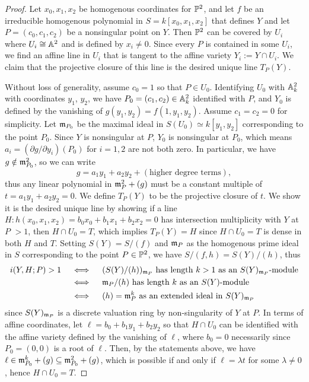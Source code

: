 \documentclass{article}
\begin{document}
\begin{enumerate} [label=\textbf{\arabic*.}, leftmargin=0cm]
\begin{proof}
  Let $x_0, x_1, x_2$ be homogenous coordinates for $\mathbb{P}^2$, and let $f$ be an irreducible homogenous polynomial in $S = k[x_0, x_1, x_2]$ that defines $Y$ and let $P = (c_0, c_1, c_2)$ be a nonsingular point on $Y$. Then $\mathbb{P}^2$ can be covered by $U_i$ where $U_i \cong \mathbb{A}^2$ and is defined by $x_i \neq 0$. Since every $P$ is contained in some $U_i$, we find an affine line in $U_i$ that is tangent to the affine variety $Y_i := Y \cap U_i$. We claim that the projective closure of this line is the desired unique line $T_P(Y)$.

  Without loss of generality, assume $c_0 = 1$ so that $P \in U_0$. Identifying $U_0$ with $\mathbb{A}_k^2$ with coordinates $y_1$, $y_2$, we have $P_0 = (c_1, c_2) \in \mathbb{A}_k^2$ identified with $P$, and $Y_0$ is defined by the vanishing of $g(y_1, y_2) = f(1, y_1, y_2)$. Assume $c_1 = c_2 = 0$ for simplicity. Let $\mathfrak{m}_{P_0}$ be the maximal ideal in $S(U_0) \simeq k[y_1, y_2]$ corresponding to the point $P_0$. Since $Y$ is nonsingular at $P$, $Y_0$ is nonsingular at $P_0$, which means $a_i = (\partial g / \partial y_i)(P_0)$ for $i = 1, 2$ are not both zero. In particular, we have $g \notin \mathfrak{m}_{P_0}^2$, so we can write
  \begin{equation*}
    g = a_1 y_1 + a_2 y_2 + (\text{higher degree terms}),
  \end{equation*}
  thus any linear polynomial in $\mathfrak{m}_P^2 + (g)$ must be a constant multiple of $t =  a_1 y_1 + a_2 y_2 = 0$. We define $T_P(Y)$ to be the projective closure of $t$. We show it is the desired unique line by showing if a line $H : h(x_0, x_1, x_2) = b_0 x_0 + b_1 x_1 + b_2 x_2 = 0$ has intersection multiplicity with $Y$ at $P$ $> 1$, then $H \cap U_0 = T$, which implies $T_P(Y) = H$ since $H \cap U_0 = T$ is dense in both $H$ and $T$. Setting $S(Y) = S/(f)$ and $\mathfrak{m}_P$ as the homogenous prime ideal in $S$ corresponding to the point $P \in \mathbb{P}^2$, we have $S / (f, h) = S(Y) / (h)$, thus
  \begin{align*}
    i(Y, H ; P) > 1 \quad & \iff \quad (S(Y) / (h))_{\mathfrak{m}_P} \text{ has length $k > 1$ as an $S(Y)_{\mathfrak{m}_P}$-module} \\
    & \iff \quad \mathfrak{m}_P / (h) \text{ has length $k$ as an $S(Y)$-module} \\
    & \iff \quad (h) = \mathfrak{m}_P^k \text{ as an extended ideal in $S(Y)_{\mathfrak{m}_P}$ }
  \end{align*}
  since $S(Y)_{\mathfrak{m}_P}$ is a discrete valuation ring by non-singularity of $Y$ at $P$. In terms of affine coordinates, let $\ell = b_0 + b_1 y_1 + b_2 y_2$ so that $H \cap U_0$ can be identified with the affine variety defined by the vanishing of $\ell$, where $b_0 = 0$ necessarily since $P_0 = (0, 0)$ is a root of $\ell$. Then, by the statements above, we have $\ell \in \mathfrak{m}_{P_0}^k + (g) \subseteq \mathfrak{m}_{P_0}^2 + (g)$, which is possible if and only if $\ell = \lambda t$ for some $\lambda \neq 0$, hence $H \cap U_0 = T$.
\end{proof}


\end{enumerate}
\end{document}
